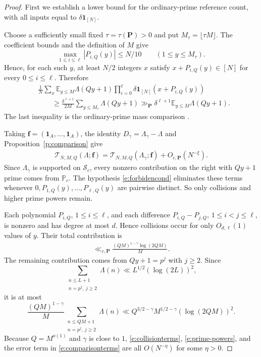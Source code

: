 \documentclass[12pt]{amsart}
\newcommand{\E}{\mathbb E}
\newcommand{\1}{\mathbf 1}
\begin{document}
\begin{proof}
First we establish a lower bound for the ordinary-prime reference
count, with all inputs equal to $\delta\1_{[N]}$.

Choose a sufficiently small fixed $\tau=\tau(\mathbf P)>0$ and put
$M_\tau=\lfloor\tau M\rfloor$. The coefficient bounds and the
definition of $M$ give
\[
 \max_{1\leq i\leq\ell}|P_{i,Q}(y)|\leq N/10
 \qquad(1\leq y\leq M_\tau).
\]
Hence, for each such $y$, at least $N/2$ integers $x$ satisfy
$x+P_{i,Q}(y)\in[N]$ for every $0\leq i\leq\ell$. Therefore
\begin{align}\label{e:model-lower}
 &\frac1N\sum_x\E_{y\leq M}\Lambda(Qy+1)
 \prod_{i=0}^{\ell}\delta\1_{[N]}(x+P_{i,Q}(y))
 \nonumber\\
 &\qquad\geq
 \frac{\delta^{\ell+1}}{2M}\sum_{y\leq M_\tau}\Lambda(Qy+1)
 \gg_{\mathbf P}
 \delta^{\ell+1}\E_{y\leq M}\Lambda(Qy+1).
\end{align}
The last inequality is the ordinary-prime mass comparison
\cite[(5.2)]{KMTT}.

Taking $\mathbf f=(\1_A,\ldots,\1_A)$, the identity
$D_\gamma=\Lambda_\gamma-\Lambda$ and
Proposition~\ref{p:comparison} give
\begin{align}\label{e:comparisonterms}
     \mathcal T_{N,M,Q}(\Lambda;\mathbf f)
 =
 \mathcal T_{N,M,Q}(\Lambda_\gamma;\mathbf f)
 +O_{c,\mathbf P}(N^{-\xi}).
\end{align}
Since $\Lambda_\gamma$ is supported on $\mathcal S_c$, every nonzero
contribution on the right with $Qy+1$ prime comes from $\mathbb P_c$.
The  hypothesis \eqref{e:forbidencond} eliminates these terms whenever
$0,P_{1,Q}(y),\ldots,P_{\ell,Q}(y)$ are pairwise distinct.
So only collisions and higher prime powers remain.

Each polynomial $P_{i,Q}$, $1\leq i\leq\ell$, and each difference
$P_{i,Q}-P_{j,Q}$, $1\leq i<j\leq\ell$, is nonzero and has
degree at most $d$.
Hence collisions occur for only $O_{d,\ell}(1)$ values of $y$.
Their total contribution is
\begin{align}\label{e:collisionterms}
    \ll_{c,\mathbf P}\frac{(QM)^{1-\gamma}\log(2QM)}M.
\end{align}
The remaining contribution comes from $Qy+1=p^j$ with $j\geq2$. Since
\[
 \sum_{\substack{n\leq L+1\\n=p^j,\ j\geq2}}\Lambda(n)
 \ll L^{1/2}(\log(2L))^2,
\]
it is at most
\begin{equation}\label{e:prime-powers}
 \frac{(QM)^{1-\gamma}}M
 \sum_{\substack{n\leq QM+1\\n=p^j,\ j\geq2}}\Lambda(n)
 \ll Q^{3/2- \gamma}M^{1/2-\gamma}(\log(2QM))^2.
\end{equation}
Because $Q=M^{o(1)}$ and $\gamma$ is close to $1$, \eqref{e:collisionterms},
\eqref{e:prime-powers}, and the error term in \eqref{e:comparisonterms} are all $O(N^{-\eta})$
for some $\eta>0$.


\end{proof}
\end{document}
